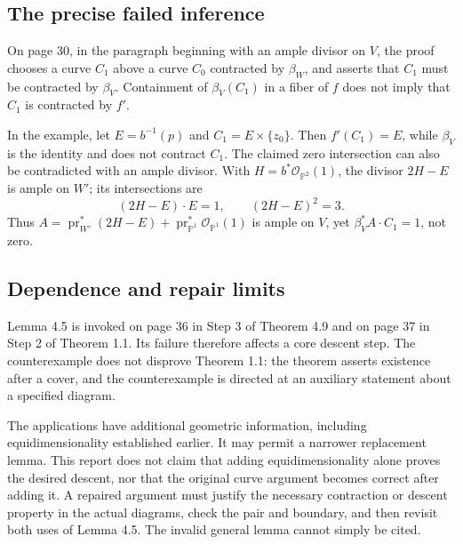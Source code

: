 \documentclass[10pt]{article}
\begin{document}
\subsection*{The precise failed inference}
On page 30, in the paragraph beginning with an ample divisor on \(V\), the proof chooses a curve \(C_1\) above a curve \(C_0\) contracted by \(\beta_W\), and asserts that \(C_1\) must be contracted by \(\beta_V\). Containment of \(\beta_V(C_1)\) in a fiber of \(f\) does not imply that \(C_1\) is contracted by \(f'\).\par
In the example, let \(E=b^{-1}(p)\) and \(C_1=E\times\{z_0\}\). Then \(f'(C_1)=E\), while \(\beta_V\) is the identity and does not contract \(C_1\). The claimed zero intersection can also be contradicted with an ample divisor. With \(H=b^*\mathcal O_{\mathbb P^2}(1)\), the divisor \(2H-E\) is ample on \(W'\); its intersections are \[(2H-E)\cdot E=1,\qquad (2H-E)^2=3.\] Thus \(A=\operatorname{pr}_{W'}^*(2H-E)+
\operatorname{pr}_{\mathbb P^1}^*\mathcal O_{\mathbb P^1}(1)\) is ample on \(V\), yet \(\beta_V^*A\cdot C_1=1\), not zero.\par
\subsection*{Dependence and repair limits}
Lemma 4.5 is invoked on page 36 in Step 3 of Theorem 4.9 and on page 37 in Step 2 of Theorem 1.1. Its failure therefore affects a core descent step. The counterexample does not disprove Theorem 1.1: the theorem asserts existence after a cover, and the counterexample is directed at an auxiliary statement about a specified diagram.\par
The applications have additional geometric information, including equidimensionality established earlier. It may permit a narrower replacement lemma. This report does not claim that adding equidimensionality alone proves the desired descent, nor that the original curve argument becomes correct after adding it. A repaired argument must justify the necessary contraction or descent property in the actual diagrams, check the pair and boundary, and then revisit both uses of Lemma 4.5. The invalid general lemma cannot simply be cited.\par
\end{document}
